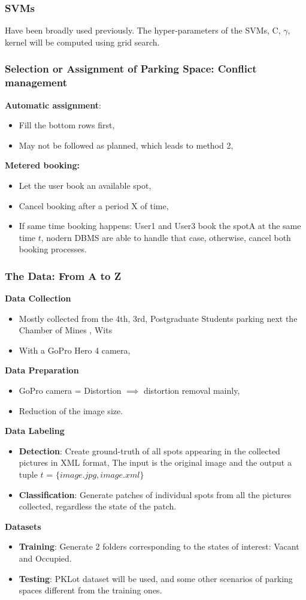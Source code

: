 \documentclass{beamer}
\begin{document}
\begin{frame}
\frametitle{SVMs}
Have been broadly used previously. The hyper-parameters of the SVMs, C, $\gamma$, kernel will be computed using grid search. 
\end{frame}

\begin{frame}
\frametitle{Selection or Assignment of Parking Space: Conflict management}
\textbf{Automatic assignment}: 
\begin{itemize}
	\item Fill the bottom rows first,
	\item May not be followed as planned, which leads to method 2,
\end{itemize}

\textbf{Metered booking: }
\begin{itemize}
	\item Let the user book an available spot,
	\item Cancel booking after a period X of time,
	\item If same time booking happens: User1 and User3 book the spotA at the same time $t$, nodern DBMS are able to handle that case, otherwise, cancel both booking processes.
\end{itemize}
\end{frame}

\begin{frame}[allowframebreaks]
\frametitle{The Data: From A to Z} 
\textbf{Data Collection}
\begin{itemize}
	\item Mostly collected from the 4th, 3rd, Postgraduate Students parking next the Chamber of Mines , Wits
	\item With a GoPro Hero 4 camera,
\end{itemize}
\textbf{Data Preparation}
\begin{itemize}
	\item GoPro camera = Distortion $\implies$ distortion removal mainly,
	\item Reduction of the image size.
\end{itemize}
\textbf{Data Labeling}
\begin{itemize}
	\item \textbf{Detection}: Create ground-truth of all spots appearing in the collected pictures  in XML format,
	The input is the original image and the output a tuple $t$ = $\lbrace image.jpg,image.xml\rbrace$
	\item \textbf{Classification}: Generate patches of individual spots from all the pictures collected, regardless the state of the patch.
\end{itemize}
\framebreak
\textbf{Datasets}
\begin{itemize}
	\item \textbf{Training}: Generate 2 folders corresponding to the states of interest: Vacant and Occupied.
	\item \textbf{Testing}: PKLot dataset will be used, and some other scenarios of parking spaces different from the training ones.
\end{itemize}

\end{frame}
\end{document}
